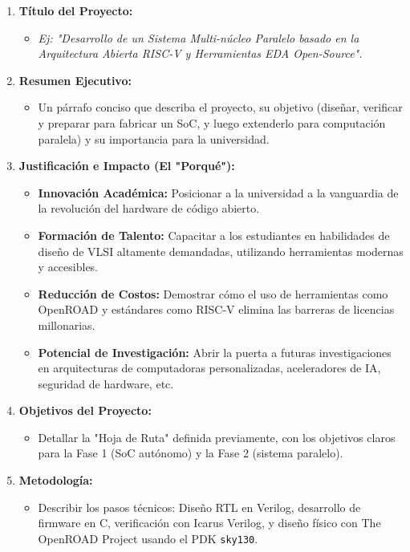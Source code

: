 \documentclass[12pt,a4paper]{article}
\begin{document}
\begin{enumerate}
    \item \textbf{Título del Proyecto:}
    \begin{itemize}
        \item \textit{Ej: "Desarrollo de un Sistema Multi-núcleo Paralelo basado en la Arquitectura Abierta RISC-V y Herramientas EDA Open-Source".}
    \end{itemize}

    \item \textbf{Resumen Ejecutivo:}
    \begin{itemize}
        \item Un párrafo conciso que describa el proyecto, su objetivo (diseñar, verificar y preparar para fabricar un SoC, y luego extenderlo para computación paralela) y su importancia para la universidad.
    \end{itemize}

    \item \textbf{Justificación e Impacto (El "Porqué"):}
    \begin{itemize}
        \item \textbf{Innovación Académica:} Posicionar a la universidad a la vanguardia de la revolución del hardware de código abierto.
        \item \textbf{Formación de Talento:} Capacitar a los estudiantes en habilidades de diseño de VLSI altamente demandadas, utilizando herramientas modernas y accesibles.
        \item \textbf{Reducción de Costos:} Demostrar cómo el uso de herramientas como OpenROAD y estándares como RISC-V elimina las barreras de licencias millonarias.
        \item \textbf{Potencial de Investigación:} Abrir la puerta a futuras investigaciones en arquitecturas de computadoras personalizadas, aceleradores de IA, seguridad de hardware, etc.
    \end{itemize}

    \item \textbf{Objetivos del Proyecto:}
    \begin{itemize}
        \item Detallar la "Hoja de Ruta" definida previamente, con los objetivos claros para la Fase 1 (SoC autónomo) y la Fase 2 (sistema paralelo).
    \end{itemize}

    \item \textbf{Metodología:}
    \begin{itemize}
        \item Describir los pasos técnicos: Diseño RTL en Verilog, desarrollo de firmware en C, verificación con Icarus Verilog, y diseño físico con The OpenROAD Project usando el PDK \texttt{sky130}.
    \end{itemize}


\end{enumerate}
\end{document}
